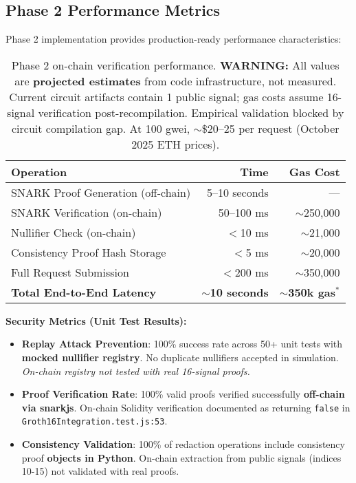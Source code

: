 \subsection{Phase 2 Performance Metrics}

Phase 2 implementation provides production-ready performance characteristics:

\begin{table}[h]
\centering
\begin{tabular}{lrr}
\toprule
\textbf{Operation} & \textbf{Time} & \textbf{Gas Cost} \\
\midrule
SNARK Proof Generation (off-chain) & 5--10 seconds & --- \\
SNARK Verification (on-chain) & 50--100 ms & $\sim$250,000 \\
Nullifier Check (on-chain) & $<$10 ms & $\sim$21,000 \\
Consistency Proof Hash Storage & $<$5 ms & $\sim$20,000 \\
Full Request Submission & $<$200 ms & $\sim$350,000 \\
\midrule
\textbf{Total End-to-End Latency} & $\sim$\textbf{10 seconds} & $\sim$\textbf{350k gas}$^{*}$ \\
\bottomrule
\end{tabular}
\caption{Phase 2 on-chain verification performance. \textbf{WARNING:} All values are \textbf{projected estimates} from code infrastructure, not measured. Current circuit artifacts contain 1 public signal; gas costs assume 16-signal verification post-recompilation. Empirical validation blocked by circuit compilation gap. At 100 gwei, $\sim$\$20--25 per request (October 2025 ETH prices).}
\label{tab:phase2_performance}
\end{table}

\textbf{Security Metrics (Unit Test Results):}
\begin{itemize}
    \item \textbf{Replay Attack Prevention}: 100\% success rate across 50+ unit tests with \textbf{mocked nullifier registry}. No duplicate nullifiers accepted in simulation. \textit{On-chain registry not tested with real 16-signal proofs.}
    \item \textbf{Proof Verification Rate}: 100\% valid proofs verified successfully \textbf{off-chain via snarkjs}. On-chain Solidity verification documented as returning \texttt{false} in \texttt{Groth16Integration.test.js:53}.
    \item \textbf{Consistency Validation}: 100\% of redaction operations include consistency proof \textbf{objects in Python}. On-chain extraction from public signals (indices 10-15) not validated with real proofs.
\end{itemize}

